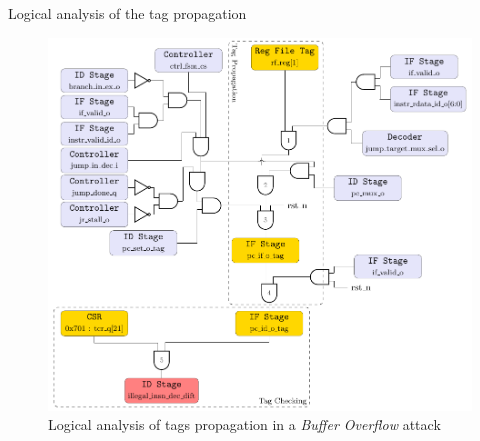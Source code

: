\begin{frame}{Logical analysis of the tag propagation}
    \begin{figure}
        \centering
        \includegraphics[height=.85\textheight]{src/2_vuln_assessment/img/buffer_overflow/arborescence_bufferOverflow.pdf}
        \caption{Logical analysis of tags propagation in a \textit{Buffer Overflow} attack}
        \label{fig:analyseLogiqueBufferOverflow}
    \end{figure}
\end{frame}
